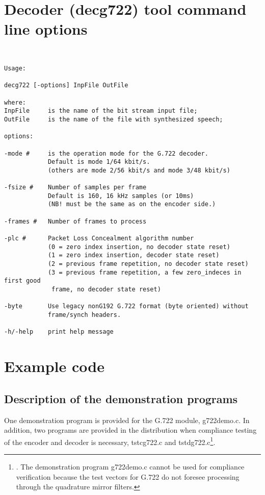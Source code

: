 \section{Decoder (decg722) tool command line options}
{\tt\small
\begin{verbatim}
Usage:

decg722 [-options] InpFile OutFile

where:
InpFile     is the name of the bit stream input file;
OutFile     is the name of the file with synthesized speech;

options:

-mode #     is the operation mode for the G.722 decoder.
            Default is mode 1/64 kbit/s.
            (others are mode 2/56 kbit/s and mode 3/48 kbit/s)

-fsize #    Number of samples per frame  
            Default is 160, 16 kHz samples (or 10ms)
            (NB! must be the same as on the encoder side.) 

-frames #   Number of frames to process

-plc #      Packet Loss Concealment algorithm number
            (0 = zero index insertion, no decoder state reset)
            (1 = zero index insertion, decoder state reset)
            (2 = previous frame repetition, no decoder state reset)
            (3 = previous frame repetition, a few zero_indeces in first good
             frame, no decoder state reset)
  
-byte       Use legacy nonG192 G.722 format (byte oriented) without
            frame/synch headers.

-h/-help    print help message
\end{verbatim}
}

\section{Example code}

\subsection {Description of the demonstration programs}

One demonstration program is provided for the G.722 module,
g722demo.c. In addition, two programs are provided in the distribution
when compliance testing of the encoder and decoder is necessary,
tstcg722.c and tstdg722.c\footnote{\SF. The demonstration program g722demo.c cannot be used for compliance verification because the test vectors for G.722 do not foresee processing through the quadrature mirror
filters.}. 

